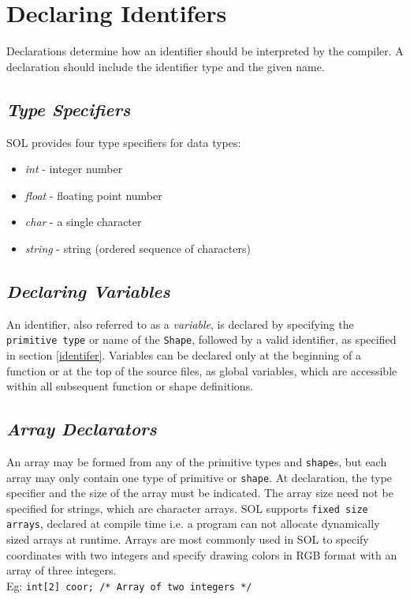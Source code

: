 \section{Declaring Identifers}

    Declarations determine how an identifier should be interpreted by the compiler. A declaration should include the identifier type and the given name.

    \subsection{\textit{Type Specifiers}} \label{type}
    SOL provides four type specifiers for data types:
    \begin{itemize}
        \itemsep0em
        \item \textit{int} - integer number
        \item \textit{float} - floating point number
        \item \textit{char} - a single character
        \item \textit{string} - string (ordered sequence of characters)
    \end{itemize}

    \subsection{\textit{Declaring Variables}}
    An identifier, also referred to as a \textit{variable}, is declared by specifying the \texttt{primitive type} or name of the \texttt{Shape}, followed by a valid identifier, as specified in section \ref{identifer}. Variables can be declared only at the beginning of a function or at the top of the source files, as global variables, which are accessible within all subsequent function or shape definitions.

    \subsection{\textit{Array Declarators}} \label{array}
    An array may be formed from any of the primitive types and \texttt{shape}s, but each array may only contain one type of primitive or \texttt{shape}. At declaration, the type specifier and the size of the array must be indicated. The array size need not be specified for strings, which are character arrays. SOL supports \texttt{fixed size arrays}, declared at compile time i.e. a program can not allocate dynamically sized arrays at runtime. Arrays are most commonly used in SOL to specify coordinates with two integers and specify drawing colors in RGB format with an array of three integers.\\
    Eg: \texttt{int[2] coor; /* Array of two integers */}

